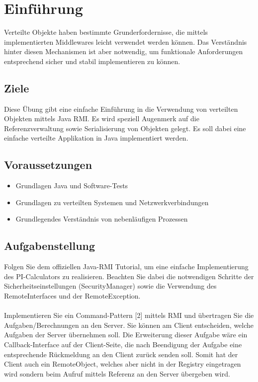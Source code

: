 
\section{Einführung}

Verteilte Objekte haben bestimmte Grunderfordernisse, die mittels implementierten Middlewares leicht verwendet werden können. Das Verständnis hinter diesen Mechanismen ist aber notwendig, um funktionale Anforderungen entsprechend sicher und stabil implementieren zu können.

\subsection{Ziele}

Diese Übung gibt eine einfache Einführung in die Verwendung von verteilten Objekten mittels Java RMI. Es wird speziell Augenmerk auf die Referenzverwaltung sowie Serialisierung von Objekten gelegt. Es soll dabei eine einfache verteilte Applikation in Java implementiert werden.

\subsection{Voraussetzungen}

\begin{itemize}
	\item Grundlagen Java und Software-Tests
	\item Grundlagen zu verteilten Systemen und Netzwerkverbindungen
	\item Grundlegendes Verständnis von nebenläufigen Prozessen
\end{itemize}

\subsection{Aufgabenstellung}

Folgen Sie dem offiziellen Java-RMI Tutorial, um eine einfache Implementierung des PI-Calculators zu realisieren. Beachten Sie dabei die notwendigen Schritte der Sicherheitseinstellungen (SecurityManager) sowie die Verwendung des RemoteInterfaces und der RemoteException. \\ 
\\
Implementieren Sie ein Command-Pattern [2] mittels RMI und übertragen Sie die Aufgaben/Berechnungen an den Server. Sie können am Client entscheiden, welche Aufgaben der Server übernehmen soll. Die Erweiterung dieser Aufgabe wäre ein Callback-Interface auf der Client-Seite, die nach Beendigung der Aufgabe eine entsprechende Rückmeldung an den Client zurück senden soll. Somit hat der Client auch ein RemoteObject, welches aber nicht in der Registry eingetragen wird sondern beim Aufruf mittels Referenz an den Server übergeben wird.

\clearpage
